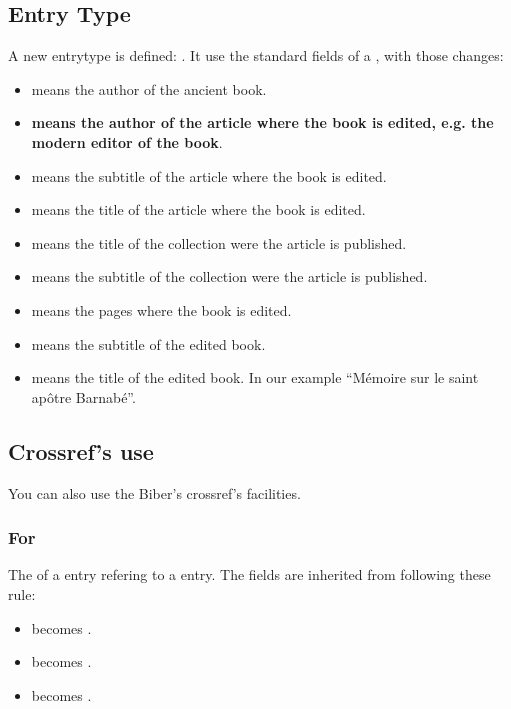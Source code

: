 \documentclass{ltxdockit}[2011/03/25]
\begin{document}
\subsection{ Entry Type}

A new entrytype is defined: . It use the standard fields of a , with those changes:

\begin{itemize}
	\item {} means the author of the ancient book.
	\item \textbf{ means the author of the article where the book is edited, e.g. the modern editor of the book}.
	\item {} means the subtitle of the article where the book is edited.
	\item {} means the title of the article where the book is edited. 
	\item {} means the title of the collection were the article is published.
	\item {} means the subtitle of the collection were the article is published.
	\item {} means the pages where the book is edited.
	\item {} means the subtitle of the edited book.
	\item {} means the title of the edited book. In our example \enquote{Mémoire sur le saint apôtre Barnabé}.


\end{itemize}


\subsection{Crossref's use}

You can also use the Biber's crossref's facilities.

\subsubsection{For }
The  of a  entry refering to a  entry. The fields are inherited from  following these rule:

\begin{itemize}
	\item {} becomes .
	\item {} becomes .
	\item {} becomes .

\end{itemize}
\end{document}
